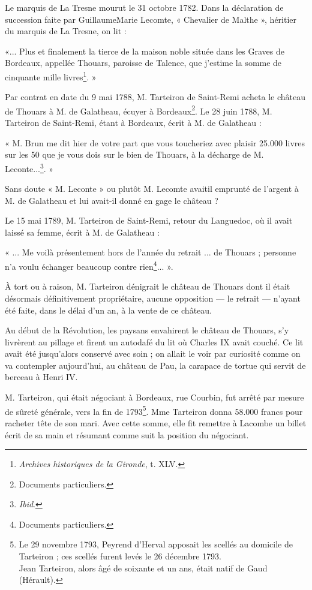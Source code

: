 Le marquis de La Tresne mourut le 31 octobre 1782. Dans la déclaration de succession faite par GuillaumeMarie Lecomte, « Chevalier de Malthe », héritier du marquis de La Tresne, on lit : 

«... Plus et finalement la tierce de la maison noble située dans les Graves de Bordeaux, appellée Thouars, paroisse de Talence, que j'estime la somme de cinquante mille livres\footnote{\textit{Archives historiques de la Gironde}, t. XLV.}. »

Par contrat en date du 9 mai 1788, M. Tarteiron de Saint-Remi acheta le château de Thouars à M. de Galatheau, écuyer à Bordeaux\footnote{Documents particuliers.}. Le 28 juin 1788, M. Tarteiron de Saint-Remi, étant à Bordeaux, écrit à M. de Galatheau :

« M. Brun me dit hier de votre part que vous toucheriez avec plaisir 25.000 livres sur les 50 que je vous dois sur le bien de Thouars, à la décharge de M. Leconte...\footnote{\textit{Ibid}.}. »

Sans doute « M. Leconte » ou plutôt M. Lecomte avaitil emprunté de l'argent à M. de Galatheau et lui avait-il donné en gage le château ?

Le 15 mai 1789, M. Tarteiron de Saint-Remi, retour du Languedoc, où il avait laissé sa femme, écrit à M. de Galatheau :

« ... Me voilà présentement hors de l'année du retrait ... de Thouars ; personne n'a voulu échanger beaucoup contre rien\footnote{Documents particuliers.}... ». 

À tort ou à raison, M. Tarteiron dénigrait le château de Thouars dont il était désormais définitivement propriétaire, aucune opposition — le retrait — n'ayant été faite, dans le délai d'un an, à la vente de ce château. 

\asterism{}

Au début de la Révolution, les paysans envahirent le château de Thouars, s'y livrèrent au pillage et firent un autodafé du lit où Charles IX avait couché. Ce lit avait été jusqu'alors conservé avec soin ; on allait le voir par curiosité comme on va contempler aujourd'hui, au château de Pau, la carapace de tortue qui servit de berceau à Henri IV.

M. Tarteiron, qui était négociant à Bordeaux, rue Courbin, fut arrêté par mesure de sûreté générale, vers la fin de 1793\footnote{Le 29 novembre 1793, Peyrend d'Herval apposait les scellés au domicile de Tarteiron ; ces scellés furent levés le 26 décembre 1793.\\Jean Tarteiron, alors âgé de soixante et un ans, était natif de Gaud (Hérault).}. Mme Tarteiron donna 58.000 francs pour racheter tête de son mari. Avec cette somme, elle fit remettre à Lacombe un billet écrit de sa main et résumant comme suit la position du négociant.

